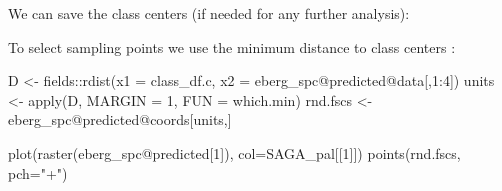 \documentclass[
  graybox,natbib,nospthms]{svmono}
\newenvironment{Shaded}{\begin{snugshade}}{\end{snugshade}}
\newcommand{\AttributeTok}[1]{\textcolor[rgb]{0.61,0.61,0.61}{#1}}
\newcommand{\CommentTok}[1]{\textcolor[rgb]{0.37,0.37,0.37}{\textit{#1}}}
\newcommand{\DecValTok}[1]{\textcolor[rgb]{0.06,0.06,0.06}{#1}}
\newcommand{\FunctionTok}[1]{\textcolor[rgb]{0,0,0}{#1}}
\newcommand{\NormalTok}[1]{#1}
\newcommand{\OtherTok}[1]{\textcolor[rgb]{0.37,0.37,0.37}{#1}}
\newcommand{\SpecialCharTok}[1]{\textcolor[rgb]{0,0,0}{#1}}
\newcommand{\StringTok}[1]{\textcolor[rgb]{0.5,0.5,0.5}{#1}}
\begin{document}
We can save the class centers (if needed for any further analysis):

\begin{Shaded}
\end{Shaded}

To select sampling points we use the minimum distance to class centers \citep{Brus2021sampling}:

\begin{Shaded}
\begin{Highlighting}[]
\NormalTok{D }\OtherTok{\textless{}{-}}\NormalTok{ fields}\SpecialCharTok{::}\FunctionTok{rdist}\NormalTok{(}\AttributeTok{x1 =}\NormalTok{ class\_df.c, }\AttributeTok{x2 =}\NormalTok{ eberg\_spc}\SpecialCharTok{@}\NormalTok{predicted}\SpecialCharTok{@}\NormalTok{data[,}\DecValTok{1}\SpecialCharTok{:}\DecValTok{4}\NormalTok{])}
\NormalTok{units }\OtherTok{\textless{}{-}} \FunctionTok{apply}\NormalTok{(D, }\AttributeTok{MARGIN =} \DecValTok{1}\NormalTok{, }\AttributeTok{FUN =}\NormalTok{ which.min)}
\NormalTok{rnd.fscs }\OtherTok{\textless{}{-}}\NormalTok{ eberg\_spc}\SpecialCharTok{@}\NormalTok{predicted}\SpecialCharTok{@}\NormalTok{coords[units,]}
\end{Highlighting}
\end{Shaded}

\begin{Shaded}
\begin{Highlighting}[]
\FunctionTok{plot}\NormalTok{(}\FunctionTok{raster}\NormalTok{(eberg\_spc}\SpecialCharTok{@}\NormalTok{predicted[}\DecValTok{1}\NormalTok{]), }\AttributeTok{col=}\NormalTok{SAGA\_pal[[}\DecValTok{1}\NormalTok{]])}
\FunctionTok{points}\NormalTok{(rnd.fscs, }\AttributeTok{pch=}\StringTok{"+"}\NormalTok{)}
\end{Highlighting}
\end{Shaded}
\end{document}
